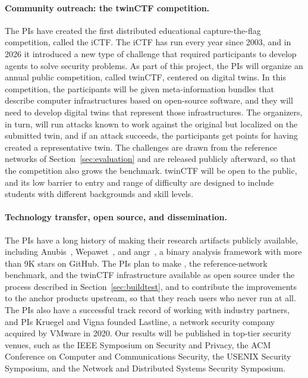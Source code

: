 \paragraph{Community outreach: the twinCTF competition.}
The PIs have created the first distributed educational capture-the-flag
competition, called the iCTF. The iCTF has run every year since 2003, and in 2026 it
introduced a new type of challenge that required participants to develop
agents to solve security problems. As part of this project, the PIs
will organize an annual public competition, called twinCTF, centered on
digital twins. In this competition, the participants will be given meta-information bundles
that describe computer infrastructures based on open-source software, and
they will need to develop digital twins that represent those infrastructures.
The organizers, in turn, will run attacks known to work against the original
but localized on the submitted twin, and if an attack succeeds, the
participants get points for having created a representative twin. The
challenges are drawn from the reference networks of
Section~\ref{sec:evaluation} and are released publicly afterward, so that the
competition also grows the benchmark. twinCTF will be open to the public, and
its low barrier to entry and range of difficulty are designed to include
students with different backgrounds and skill levels.

\paragraph{Technology transfer, open source, and dissemination.}
The PIs have a long history of making their research artifacts publicly
available, including Anubis~\cite{anubis}, Wepawet~\cite{cova10:wepawet}, and
angr~\cite{angr,shoshitaishvili2016state}, a binary analysis framework with
more than 9K stars on GitHub. The PIs plan to make \sysname, the
reference-network benchmark, and the twinCTF infrastructure available as open
source under the process described in Section~\ref{sec:buildtest}, and to
contribute the improvements to the anchor products upstream, so that they
reach users who never run \sysname at all. The PIs also have a successful
track record of working with industry partners, and PIs Kruegel and Vigna
founded Lastline, a network security company acquired by VMware in 2020. Our
results will be published in top-tier security venues, such as the IEEE
Symposium on Security and Privacy, the ACM Conference on Computer and
Communications Security, the USENIX Security Symposium, and the Network and
Distributed Systems Security Symposium.
